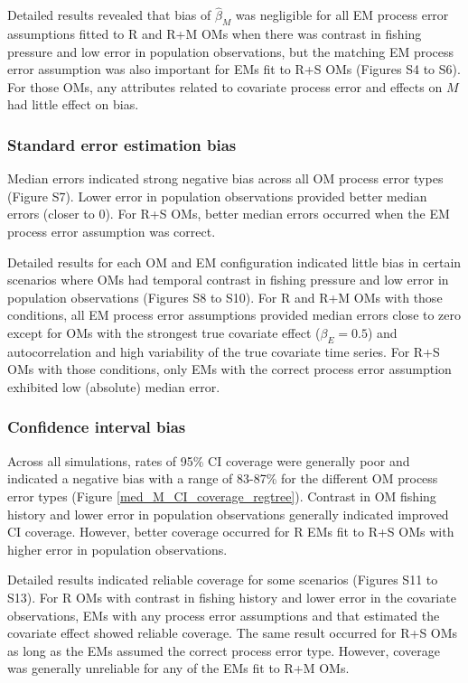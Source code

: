 \documentclass[
  12pt,
]{article}
\begin{document}
Detailed results revealed that bias of \(\widehat \beta_M\) was
negligible for all EM process error assumptions fitted to R and R+M OMs
when there was contrast in fishing pressure and low error in population
observations, but the matching EM process error assumption was also
important for EMs fit to R+S OMs (Figures S4 to S6). For those OMs, any
attributes related to covariate process error and effects on \(M\) had
little effect on bias.

\subsubsection*{Standard error estimation
bias}\label{standard-error-estimation-bias}

Median errors indicated strong negative bias across all OM process error
types (Figure S7). Lower error in population observations provided
better median errors (closer to 0). For R+S OMs, better median errors
occurred when the EM process error assumption was correct.

Detailed results for each OM and EM configuration indicated little bias
in certain scenarios where OMs had temporal contrast in fishing pressure
and low error in population observations (Figures S8 to S10). For R and
R+M OMs with those conditions, all EM process error assumptions provided
median errors close to zero except for OMs with the strongest true
covariate effect (\(\beta_E = 0.5\)) and autocorrelation and high
variability of the true covariate time series. For R+S OMs with those
conditions, only EMs with the correct process error assumption exhibited
low (absolute) median error.

\subsubsection*{Confidence interval
bias}\label{confidence-interval-bias}

Across all simulations, rates of 95\% CI coverage were generally poor
and indicated a negative bias with a range of 83-87\% for the different
OM process error types (Figure \ref{med_M_CI_coverage_regtree}).
Contrast in OM fishing history and lower error in population
observations generally indicated improved CI coverage. However, better
coverage occurred for R EMs fit to R+S OMs with higher error in
population observations.

Detailed results indicated reliable coverage for some scenarios (Figures
S11 to S13). For R OMs with contrast in fishing history and lower error
in the covariate observations, EMs with any process error assumptions
and that estimated the covariate effect showed reliable coverage. The
same result occurred for R+S OMs as long as the EMs assumed the correct
process error type. However, coverage was generally unreliable for any
of the EMs fit to R+M OMs.
\end{document}
